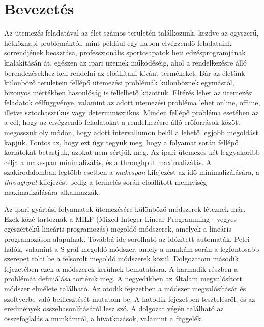 \chapter{Bevezetés}
Az ütemezés feladatával az élet számos területén találkozunk, kezdve az egyszerű, hétköznapi problémáktól, mint például egy napon elvégzendő feladataink sorrendjének beosztása, professzionális sportcsapatok heti edzésprogramjának kialakításán át, egészen az ipari üzemek működéséig, ahol a rendelkezésre álló berendezésekhez kell rendelni az előállítani kívánt termékeket. Bár az életünk különböző területein fellépő ütemezési problémák különböznek egymástól, bizonyos mértékben hasonlóság is fellelhető közöttük. Eltérés lehet az ütemezési feladatok célfüggvénye, valamint az adott ütemezési probléma lehet online, offline, illetve sztochasztikus vagy determinisztikus. Minden fellépő probléma esetében az a cél, hogy az elvégzendő feladatokat a rendelkezésre álló erőforrások között megosszuk oly módon, hogy adott intervallumon belül a lehető legjobb megoldást kapjuk. Fontos az, hogy ezt úgy tegyük meg, hogy a folyamat során fellépő korlátokat betartjuk, azokat nem sértjük meg. Az ipari ütemezés két leggyakoribb célja a makespan minimalizálás, és a throughput maximalizálás. A szakirodalomban legtöbb esetben a \textit{makespan} kifejezést az idő minimalizálására, a \textit{throughput} kifejezést pedig a termelés során előállított mennyiség maximalizálására alkalmazzák.

Az ipari gyártási folyamatok ütemezésére különböző módszerek léteznek már. Ezek közé tartoznak a MILP (Mixed Integer Linear Programming - vegyes egészértékű lineáris programozás) megoldó módszerek, amelyek a lineáris programozáson alapulnak. Továbbá ide sorolható az időzített automaták, Petri hálók, valamint a S-gráf megoldó módszer, amely a munkám során a legfontosabb szerepet tölti be a felsorolt megoldó módszerek közül. Dolgozatom második fejezetében ezek a módszerek kerülnek bemutatásra. A harmadik részben a problémát definiálása történik meg. A negyedikben az általam megvalósított módszer elmélete található. Az ötödik fejezetben a módszer megvalósítását és szoftverbe való beillesztését mutatom be. A hatodik fejezetben tesztelésről, és az eredmények összehasonlításáról lesz szó. A dolgozat végén található az összefoglalás a munkámról, a hivatkozások, valamint a függelék.